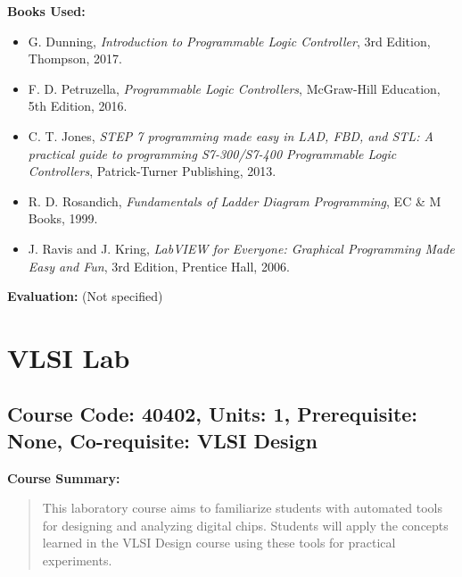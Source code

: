 \documentclass[12pt]{article}
\begin{document}
\textbf{Books Used:}
\begin{itemize}
    \item G. Dunning, \textit{Introduction to Programmable Logic Controller}, 3rd Edition, Thompson, 2017.
    \item F. D. Petruzella, \textit{Programmable Logic Controllers}, McGraw-Hill Education, 5th Edition, 2016.
    \item C. T. Jones, \textit{STEP 7 programming made easy in LAD, FBD, and STL: A practical guide to programming S7-300/S7-400 Programmable Logic Controllers}, Patrick-Turner Publishing, 2013.
    \item R. D. Rosandich, \textit{Fundamentals of Ladder Diagram Programming}, EC \& M Books, 1999.
    \item J. Ravis and J. Kring, \textit{LabVIEW for Everyone: Graphical Programming Made Easy and Fun}, 3rd Edition, Prentice Hall, 2006.
\end{itemize}

\textbf{Evaluation:}
(Not specified)

\newpage

\section{VLSI Lab}
\subsection*{Course Code: 40402, Units: 1, Prerequisite: None, Co-requisite: VLSI Design}

\textbf{Course Summary:} 
\begin{quote}
   This laboratory course aims to familiarize students with automated tools for designing and analyzing digital chips. Students will apply the concepts learned in the VLSI Design course using these tools for practical experiments.
\end{quote}
\end{document}
